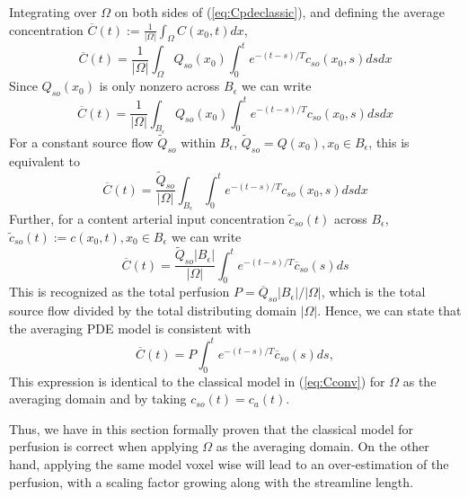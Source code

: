 \documentclass[paper=a4, fontsize=11pt,parskip=half,headings=small]{scrartcl}
\begin{document}
Integrating over $\Omega$ on both sides of (\ref{eq:Cpdeclassic}), and defining the average concentration $\overline{C}(t):= \frac{1}{|\Omega|}\int_{\Omega}C(x_0,t)dx$, 
\begin{equation}
\overline{C}(t) = \frac{1}{|\Omega|}\int_{\Omega} Q_{so}(x_0)  \int_{0}^t e^{-(t - s)/T}c_{so}(x_0,s) ds dx
\label{eq:Cpdeclassicroi}
\end{equation}
Since $Q_{so}(x_0)$ is only nonzero across $B_\epsilon$ we can write
\begin{equation}
\overline{C}(t) = \frac{1}{|\Omega|}\int_{B_\epsilon} Q_{so}(x_0)  \int_{0}^t e^{-(t - s)/T}c_{so}(x_0,s) ds dx
\label{eq:Cpdeclassicroitemp}
\end{equation}
For a constant source flow $\tilde{Q}_{so}$ within $B_\epsilon$, $\tilde{Q}_{so} = Q(x_0), x_0 \in B_\epsilon$, this is equivalent to
\begin{equation}
\overline{C}(t) = \frac{\tilde{Q}_{so}}{|\Omega|}\int_{B_\epsilon}  \int_{0}^t e^{-(t - s)/T}c_{so}(x_0,s) ds dx
\label{eq:Cpdeclassicroitemp}
\end{equation}
Further, for a content arterial input concentration $\tilde{c}_{so}(t)$ across $B_\epsilon$, $\tilde{c}_{so}(t) := c(x_0,t), x_0 \in B_\epsilon$ we can write
\begin{equation}
\overline{C}(t) = \frac{\tilde{Q}_{so} |B_\epsilon|}{|\Omega|}  \int_{0}^t e^{-(t - s)/T}\overline{c}_{so}(s) ds
\label{eq:Cpdeclassicroitemp}
\end{equation}
This is recognized as the total perfusion $P = \overline{Q}_{so}|B_\epsilon|/|\Omega|$, which is the total source flow divided by the total distributing domain $|\Omega|$. Hence, we can state that the averaging PDE model is consistent with
\begin{equation}
\overline{C}(t) = P \int_{0}^t e^{-(t - s)/T}\overline{c}_{so}(s) ds,
\label{eq:Cpdeclassicroitemp}
\end{equation}
This expression is identical to the classical model in (\ref{eq:Cconv}) for $\Omega$ as the averaging domain and by taking $c_{so}(t) = c_a(t)$.

Thus, we have in this section formally proven that the classical model for perfusion is correct when applying $\Omega$ as the averaging domain. On the other hand, applying the same model voxel wise will lead to an over-estimation of the perfusion, with a scaling factor growing along with the streamline length.


\end{document}
